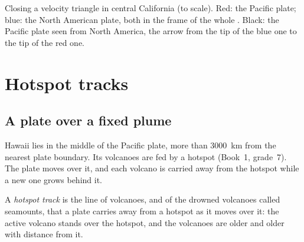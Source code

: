 \begin{omfigure}

{\small Closing a velocity triangle in central California (to scale). Red:
the Pacific plate; blue: the North American plate, both in the frame of the
whole . Black: the Pacific plate seen from North America, the
arrow from the tip of the blue one to the tip of the red one.}
\end{omfigure}

\section{Hotspot tracks}

\subsection{A plate over a fixed plume}

Hawaii lies in the middle of the Pacific plate, more than \qty{3000}{km}
from the nearest plate boundary.
 Its volcanoes are fed by a hotspot (Book~1,
grade~7). The plate moves over it, and each volcano is carried away from the
hotspot while a new one grows behind it.

\begin{definition}\label{def:g11:plate-motions:hotspot-track}
A \emph{hotspot track} is the line of volcanoes, and of
the drowned volcanoes called seamounts, that a plate carries away from a
hotspot as it moves over it: the active volcano stands over the hotspot, and
the volcanoes are older and older with distance from it.
\end{definition}

